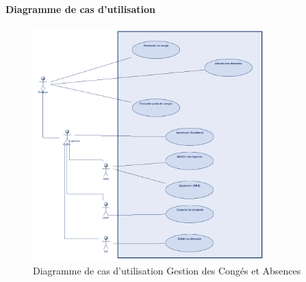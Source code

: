 \paragraph{Diagramme de cas d'utilisation}
\begin{figure}[H]
    \centering
    \includegraphics[width=0.8\textwidth]{images/diagrammes/use-cases/conges.png}
    \caption{Diagramme de cas d'utilisation Gestion des Congés et Absences}
    \label{fig:use_case_gestion_conges}
\end{figure}

